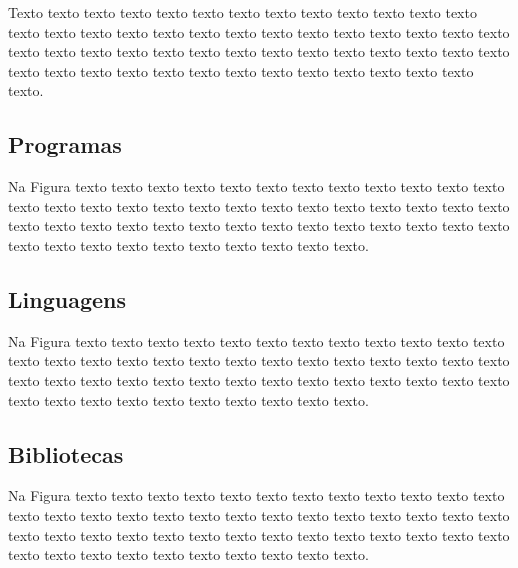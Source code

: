Texto texto texto texto texto texto texto texto texto texto texto texto texto
texto texto texto texto texto texto texto texto texto texto texto texto texto
texto texto texto texto texto texto texto texto texto texto texto texto texto
texto texto texto texto texto texto texto texto texto texto texto texto texto
texto texto texto.

\subsection{Programas}
\label{sec:acidos_nucleicos}

Na Figura texto texto texto texto texto texto texto texto
texto texto texto texto texto texto texto texto texto texto texto texto texto
texto texto texto texto texto texto texto texto texto texto texto texto texto
texto texto texto texto texto texto texto texto texto texto texto texto texto
texto texto texto.


\subsection{Linguagens}
\label{sec:acidos_nucleicos}

Na Figura texto texto texto texto texto texto texto texto
texto texto texto texto texto texto texto texto texto texto texto texto texto
texto texto texto texto texto texto texto texto texto texto texto texto texto
texto texto texto texto texto texto texto texto texto texto texto texto texto
texto texto texto.


\subsection{Bibliotecas}
\label{sec:acidos_nucleicos}

Na Figura texto texto texto texto texto texto texto texto
texto texto texto texto texto texto texto texto texto texto texto texto texto
texto texto texto texto texto texto texto texto texto texto texto texto texto
texto texto texto texto texto texto texto texto texto texto texto texto texto
texto texto texto.



